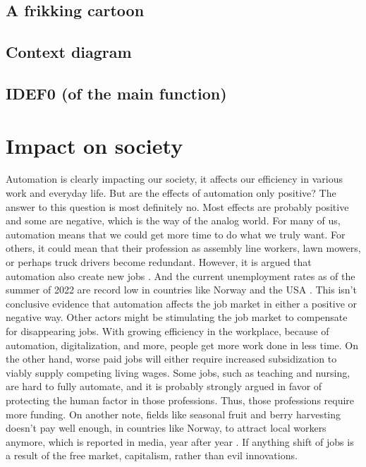 \documentclass[%
oneside,    %
project,    %
nosummary   %
]{USN-MSc}
\begin{document}
\section{A frikking cartoon}
\label{sec:cartoon}
\lipsum[4]

\section{Context diagram}
\label{sec:contextDiagram}
\lipsum[4]

\section{IDEF0 (of the main function)}
\label{sec:IDEF0}
\lipsum[4]

\chapter{Impact on society}
\label{ch:impact}

Automation is clearly impacting our society, it affects our efficiency in various work and everyday life.
But are the effects of automation only positive? The answer to this question is most definitely no.
Most effects are probably positive and some are negative, which is the way of the analog world.
For many of us, automation means that we could get more time to do what we truly want.
For others, it could mean that their profession as assembly line workers, lawn mowers, or perhaps truck drivers become redundant.
However, it is argued that automation also create new jobs \cite{CERNETIC2002167}.
And the current unemployment rates as of the summer of 2022 are record low in countries like Norway \cite{Lavestea6:online} and the USA \cite{Theunemp77:online}.
This isn't conclusive evidence that automation affects the job market in either a positive or negative way.
Other actors might be stimulating the job market to compensate for disappearing jobs.
With growing efficiency in the workplace, because of automation, digitalization, and more, people get more work done in less time.
On the other hand, worse paid jobs will either require increased subsidization to viably supply competing living wages.
Some jobs, such as teaching and nursing, are hard to fully automate, and it is probably strongly argued in favor of protecting the human factor in those professions.
Thus, those professions require more funding. On another note, 
fields like seasonal fruit and berry harvesting doesn't pay well enough,
in countries like Norway, to attract local workers anymore, 
which is reported in media, year after year \cite{Toavtrej43:online}.
If anything shift of jobs is a result of the free market, capitalism, rather than evil innovations.
\end{document}
